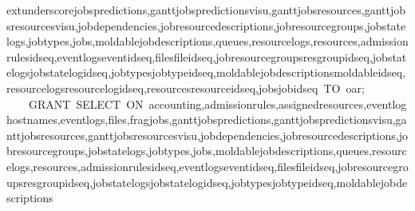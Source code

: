 {{extunderscore}jobs{\Dtextunderscore}predictions{,}gantt{\Dtextunderscore}jobs{\Dtextunderscore}predictions{\Dtextunderscore}visu{,}gantt{\Dtextunderscore}jobs{\Dtextunderscore}resources{,}gantt{\Dtextunderscore}jobs{\Dtextunderscore}resources{\Dtextunderscore}visu{,}job{\Dtextunderscore}dependencies{,}job{\Dtextunderscore}resource{\Dtextunderscore}descriptions{,}job{\Dtextunderscore}resource{\Dtextunderscore}groups{,}job{\Dtextunderscore}state{\Dtextunderscore}logs{,}job{\Dtextunderscore}types{,}jobs{,}moldable{\Dtextunderscore}job{\Dtextunderscore}descriptions{,}queues{,}resource{\Dtextunderscore}logs{,}resources{,}admission{\Dtextunderscore}rules{\Dtextunderscore}id{\Dtextunderscore}seq{,}event{\Dtextunderscore}logs{\Dtextunderscore}event{\Dtextunderscore}id{\Dtextunderscore}seq{,}files{\Dtextunderscore}file{\Dtextunderscore}id{\Dtextunderscore}seq{,}job{\Dtextunderscore}resource{\Dtextunderscore}groups{\Dtextunderscore}res{\Dtextunderscore}group{\Dtextunderscore}id{\Dtextunderscore}seq{,}job{\Dtextunderscore}state{\Dtextunderscore}logs{\Dtextunderscore}job{\Dtextunderscore}state{\Dtextunderscore}log{\Dtextunderscore}id{\Dtextunderscore}seq{,}job{\Dtextunderscore}types{\Dtextunderscore}job{\Dtextunderscore}type{\Dtextunderscore}id{\Dtextunderscore}seq{,}moldable{\Dtextunderscore}job{\Dtextunderscore}descriptions{\Dtextunderscore}moldable{\Dtextunderscore}id{\Dtextunderscore}seq{,}resource{\Dtextunderscore}logs{\Dtextunderscore}resource{\Dtextunderscore}log{\Dtextunderscore}id{\Dtextunderscore}seq{,}resources{\Dtextunderscore}resource{\Dtextunderscore}id{\Dtextunderscore}seq{,}jobs{\Dtextunderscore}job{\Dtextunderscore}id{\Dtextunderscore}seq~TO~oar;\mbox{}\\~~~~GRANT~SELECT~ON~accounting{,}admission{\Dtextunderscore}rules{,}assigned{\Dtextunderscore}resources{,}event{\Dtextunderscore}log{\Dtextunderscore}hostnames{,}event{\Dtextunderscore}logs{,}files{,}frag{\Dtextunderscore}jobs{,}gantt{\Dtextunderscore}jobs{\Dtextunderscore}predictions{,}gantt{\Dtextunderscore}jobs{\Dtextunderscore}predictions{\Dtextunderscore}visu{,}gantt{\Dtextunderscore}jobs{\Dtextunderscore}resources{,}gantt{\Dtextunderscore}jobs{\Dtextunderscore}resources{\Dtextunderscore}visu{,}job{\Dtextunderscore}dependencies{,}job{\Dtextunderscore}resource{\Dtextunderscore}descriptions{,}job{\Dtextunderscore}resource{\Dtextunderscore}groups{,}job{\Dtextunderscore}state{\Dtextunderscore}logs{,}job{\Dtextunderscore}types{,}jobs{,}moldable{\Dtextunderscore}job{\Dtextunderscore}descriptions{,}queues{,}resource{\Dtextunderscore}logs{,}resources{,}admission{\Dtextunderscore}rules{\Dtextunderscore}id{\Dtextunderscore}seq{,}event{\Dtextunderscore}logs{\Dtextunderscore}event{\Dtextunderscore}id{\Dtextunderscore}seq{,}files{\Dtextunderscore}file{\Dtextunderscore}id{\Dtextunderscore}seq{,}job{\Dtextunderscore}resource{\Dtextunderscore}groups{\Dtextunderscore}res{\Dtextunderscore}group{\Dtextunderscore}id{\Dtextunderscore}seq{,}job{\Dtextunderscore}state{\Dtextunderscore}logs{\Dtextunderscore}job{\Dtextunderscore}state{\Dtextunderscore}log{\Dtextunderscore}id{\Dtextunderscore}seq{,}job{\Dtextunderscore}types{\Dtextunderscore}job{\Dtextunderscore}type{\Dtextunderscore}id{\Dtextunderscore}seq{,}moldable{\Dtextunderscore}job{\Dtextunderscore}descriptions{\Dtextun}}
